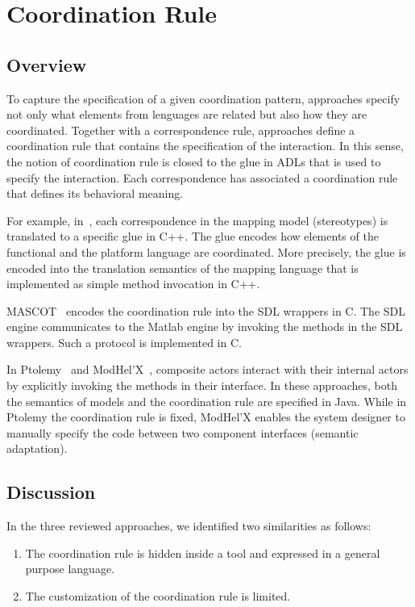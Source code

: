\section{Coordination Rule}
\subsection{Overview}
To capture the specification of a given coordination pattern, approaches specify not only what elements from lenguages are related but also how they are coordinated. Together with a correspondence rule, approaches define a coordination rule that contains the specification of the interaction. In this sense, the notion of coordination rule is closed to the glue in ADLs that is used to specify the interaction. Each correspondence has associated a coordination rule that defines its behavioral meaning. 

For example, in~\cite{dinatale}, each correspondence in the mapping model (\ie stereotypes) is translated to a specific glue in C++. The glue encodes how elements of the functional and the platform language are coordinated. More precisely, the glue is encoded into the translation semantics of the mapping language that is implemented as simple method invocation in C++.

MASCOT~\cite{mascotbib} encodes the coordination rule into the SDL wrappers in C. The SDL engine communicates to the Matlab engine by invoking the methods in the SDL wrappers. Such a protocol is implemented in C. 
			
In Ptolemy~\cite{ptoleframebib} and ModHel'X~\cite{modhelxbib}, composite actors interact with their internal actors by explicitly invoking the methods in their interface. In these approaches, both the semantics of models and the coordination rule are specified in Java. While in Ptolemy the coordination rule is fixed, ModHel'X enables the system designer to manually specify the code between two component interfaces (\ie semantic adaptation).

\subsection{Discussion}
In the three reviewed approaches, we identified two similarities as follows:
	
\begin{enumerate}
\item The coordination rule is hidden inside a tool and expressed in a general purpose language.
\item The customization of the coordination rule is limited.
\end{enumerate}
		
